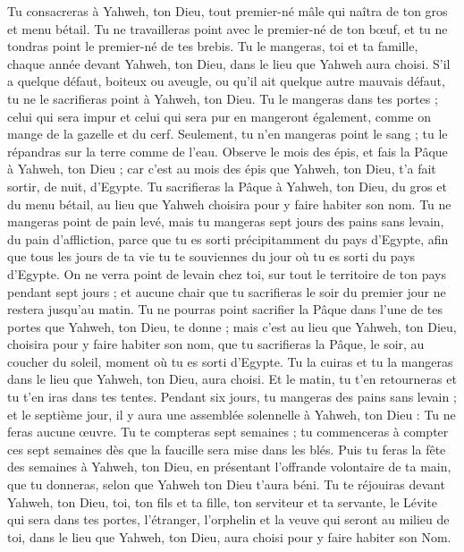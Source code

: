 \begin{multicols}{2}
Tu consacreras à Yahweh, ton Dieu, tout premier-né mâle qui naîtra de ton gros et menu bétail. Tu ne travailleras point avec le premier-né de ton bœuf, et tu ne tondras point le premier-né de tes brebis.
Tu le mangeras, toi et ta famille, chaque année devant Yahweh, ton Dieu, dans le lieu que Yahweh aura choisi.
S'il a quelque défaut, boiteux ou aveugle, ou qu'il ait quelque autre mauvais défaut, tu ne le sacrifieras point à Yahweh, ton Dieu.
Tu le mangeras dans tes portes ; celui qui sera impur et celui qui sera pur en mangeront également, comme on mange de la gazelle et du cerf.
Seulement, tu n'en mangeras point le sang ; tu le répandras sur la terre comme de l'eau.
\VerseOne{}Observe le mois des épis, et fais la Pâque à Yahweh, ton Dieu ; car c’est au mois des épis que Yahweh, ton Dieu, t'a fait sortir, de nuit, d’Egypte.
Tu sacrifieras la Pâque à Yahweh, ton Dieu, du gros et du menu bétail, au lieu que Yahweh choisira pour y faire habiter son nom.
Tu ne mangeras point de pain levé, mais tu mangeras sept jours des pains sans levain, du pain d'affliction, parce que tu es sorti précipitamment du pays d'Egypte, afin que tous les jours de ta vie tu te souviennes du jour où tu es sorti du pays d'Egypte.
On ne verra point de levain chez toi, sur tout le territoire de ton pays pendant sept jours ; et aucune chair que tu sacrifieras le soir du premier jour ne restera jusqu'au matin.
Tu ne pourras point sacrifier la Pâque dans l’une de tes portes que Yahweh, ton Dieu, te donne ;
mais c’est au lieu que Yahweh, ton Dieu, choisira pour y faire habiter son nom, que tu sacrifieras la Pâque, le soir, au coucher du soleil, moment où tu es sorti d'Egypte.
Tu la cuiras et tu la mangeras dans le lieu que Yahweh, ton Dieu, aura choisi. Et le matin, tu t'en retourneras et tu t'en iras dans tes tentes.
Pendant six jours, tu mangeras des pains sans levain ; et le septième jour, il y aura une assemblée solennelle à Yahweh, ton Dieu : Tu ne feras aucune œuvre.
Tu te compteras sept semaines ; tu commenceras à compter ces sept semaines dès que la faucille sera mise dans les blés.
Puis tu feras la fête des semaines à Yahweh, ton Dieu, en présentant l'offrande volontaire de ta main, que tu donneras, selon que Yahweh ton Dieu t'aura béni.
Tu te réjouiras devant Yahweh, ton Dieu, toi, ton fils et ta fille, ton serviteur et ta servante, le Lévite qui sera dans tes portes, l'étranger, l'orphelin et la veuve qui seront au milieu de toi, dans le lieu que Yahweh, ton Dieu, aura choisi pour y faire habiter son Nom.

\end{multicols}

